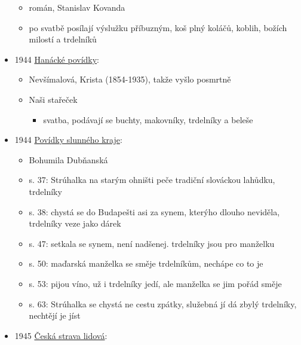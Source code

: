 \begin{itemize}
  \begin{itemize}
  \tightlist
  \item
    román, Stanislav Kovanda
  \item
    po svatbě posílají výslužku příbuzným, koš plný koláčů, koblih,
    božích milostí a trdelníků
  \end{itemize}
\item
  1944
  \href{https://ceskadigitalniknihovna.cz/uuid/uuid:bca2a111-2a25-42f8-b998-2567d7c7e193}{Hanácké
  povídky}:

  \begin{itemize}
  \tightlist
  \item
    Nevšímalová, Krista (1854-1935), takže vyšlo posmrtně
  \item
    Naši stařeček

    \begin{itemize}
    \tightlist
    \item
      svatba, podávají se buchty, makovníky, trdelníky a beleše
    \end{itemize}
  \end{itemize}
\item
  1944
  \href{https://ceskadigitalniknihovna.cz/uuid/uuid:78576090-e45a-11e5-8d5f-005056827e51}{Povídky
  slunného kraje}:

  \begin{itemize}
  \tightlist
  \item
    Bohumila Dubňanská
  \item
    s. 37: Strúhalka na starým ohništi peče tradiční slováckou lahůdku,
    trdelníky
  \item
    s. 38: chystá se do Budapešti asi za synem, kterýho dlouho neviděla,
    trdelníky veze jako dárek
  \item
    s. 47: setkala se synem, není nadšenej. trdelníky jsou pro manželku
  \item
    s. 50: maďarská manželka se směje trdelníkům, nechápe co to je
  \item
    s. 53: pijou víno, už i trdelníky jedí, ale manželka se jim pořád
    směje
  \item
    s. 63: Strúhalka se chystá ne cestu zpátky, služebná jí dá zbylý
    trdelníky, nechtějí je jíst
  \end{itemize}
\item
  1945
  \href{https://ceskadigitalniknihovna.cz/view/uuid:89562bf0-7962-11e5-9690-005056827e51?page=uuid\%3A521d38f0-92de-11e5-bf6c-005056825209&fulltext=trdeln\%C3\%ADk\%20OR\%20trdeln\%C3\%ADky\%20OR\%20trdeln\%C3\%ADk\%C5\%AF&source=mzk}{Česká
  strava lidová}:


\end{itemize}

